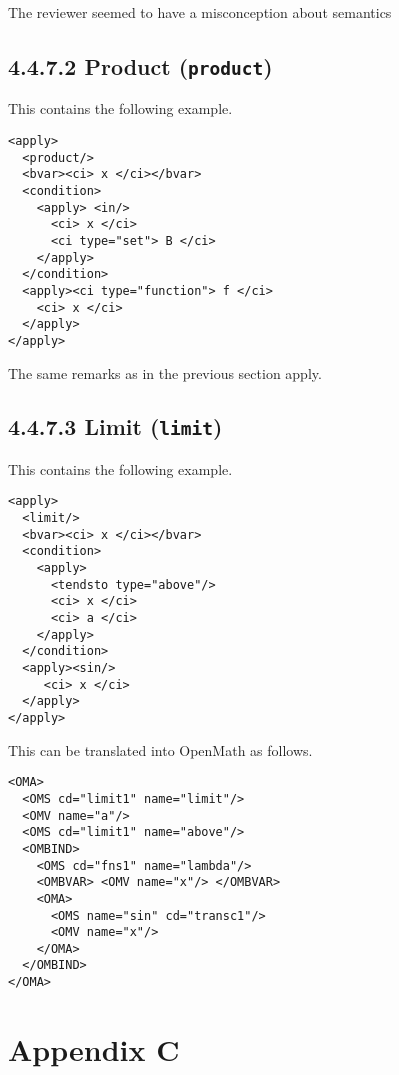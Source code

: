 \documentclass{llncs}
\begin{document}
\begin{newpart}{The reviewer seemed to have a misconception about semantics}
\subsection{4.4.7.2 Product ({\tt product}) }\label{4472}
This contains the following example.
\begin{lstlisting}[language=MathML2]
<apply>
  <product/>
  <bvar><ci> x </ci></bvar>
  <condition>
    <apply> <in/>
      <ci> x </ci>
      <ci type="set"> B </ci>
    </apply>
  </condition>
  <apply><ci type="function"> f </ci>
    <ci> x </ci>
  </apply>
</apply>
\end{lstlisting}
The same remarks as in the previous section apply.
\subsection{4.4.7.3 Limit ({\tt limit}) }\label{4473}
This contains the following example.
\begin{lstlisting}[language=MathML2]
<apply>
  <limit/>
  <bvar><ci> x </ci></bvar>
  <condition>
    <apply>
      <tendsto type="above"/>
      <ci> x </ci>
      <ci> a </ci>
    </apply>
  </condition>
  <apply><sin/>
     <ci> x </ci>
  </apply>
</apply>
\end{lstlisting}
This can be translated into OpenMath as follows.
\begin{lstlisting}
<OMA>
  <OMS cd="limit1" name="limit"/>
  <OMV name="a"/>
  <OMS cd="limit1" name="above"/>
  <OMBIND>
    <OMS cd="fns1" name="lambda"/>
    <OMBVAR> <OMV name="x"/> </OMBVAR>
    <OMA>
      <OMS name="sin" cd="transc1"/>
      <OMV name="x"/>
    </OMA>
  </OMBIND>
</OMA>
\end{lstlisting}
\section{Appendix C}

\end{newpart}
\end{document}
